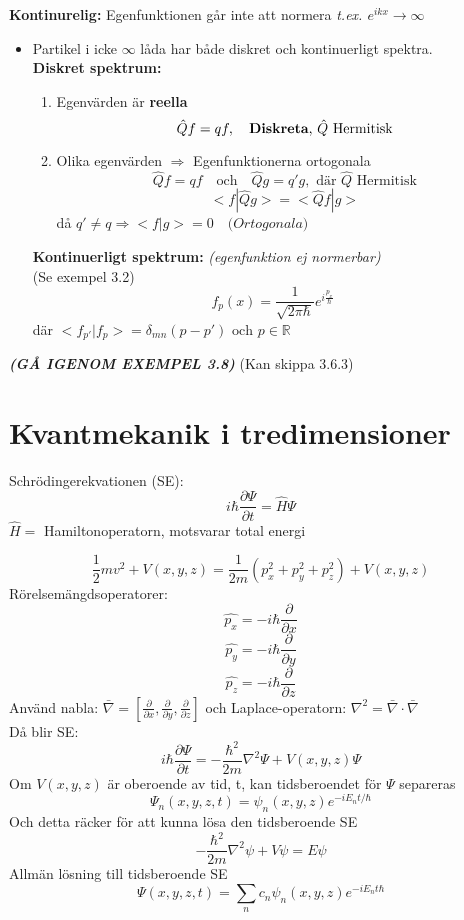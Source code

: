 \documentclass{article}
\begin{document}
    \textbf{Kontinurelig:} Egenfunktionen går inte att normera \textit{t.ex. $e^{ikx}\rightarrow\infty$}
    \begin{itemize}
      \item Partikel i icke $\infty$ låda har både diskret och kontinuerligt spektra.\\

      \textbf{Diskret spektrum:}
      \begin{enumerate}
        \item Egenvärden är \textbf{reella}
        \[
          \hat{Q}f=qf,\quad\text{\textbf{Diskreta}, $\hat{Q}$ Hermitisk}
        \]
        \item Olika egenvärden $\Rightarrow$ Egenfunktionerna ortogonala
        \[
          \hat{Q}f=qf\quad\text{och}\quad\hat{Q}g=q'g,\text{ där $\hat{Q}$ Hermitisk}
        \]
        \[
          <f|\hat{Q}g>=<\hat{Q}f|g>
        \]
        då $q'\neq q\Rightarrow<f|g>=0\quad\textit{(Ortogonala)}$
      \end{enumerate}
      \textbf{Kontinuerligt spektrum:} \textit{(egenfunktion ej normerbar)}\\
      (Se exempel 3.2)
      \[
        f_p(x)=\frac{1}{\sqrt{2\pi\hbar}}e^{i\frac{p_x}{\hbar}}
      \]
      där $<f_{p'}|f_p>=\delta_{mn}(p-p')\text{ och }p\in\mathbb{R}$

    \end{itemize}

    \textbf{\textit{(GÅ IGENOM EXEMPEL 3.8)}} (Kan skippa 3.6.3)

\section{Kvantmekanik i tredimensioner}
  Schrödingerekvationen (SE):
  \[
    i\hbar\frac{\partial \Psi}{\partial t}= \hat{H}\Psi
  \]
  $\hat{H}=$ Hamiltonoperatorn, motsvarar total energi

  \[
    \frac{1}{2}mv^2+V(x,y,z)=\frac{1}{2m}(p_x^2+p_y^2+p_z^2)+V(x,y,z)
  \]
  Rörelsemängdsoperatorer:
  \[
    \hat{p_x}=-i\hbar\frac{\partial}{\partial x}
  \]
  \[
    \hat{p_y}=-i\hbar\frac{\partial}{\partial y}
  \]
  \[
    \hat{p_z}=-i\hbar\frac{\partial}{\partial z}
  \]
  Använd nabla: $\bar{\nabla}=[\frac{\partial}{\partial x},\frac{\partial}{\partial y},\frac{\partial}{\partial z}]$ och Laplace-operatorn: $\nabla^2=\bar{\nabla}\cdot\bar{\nabla}$\\
  Då blir SE:
  \[
    i\hbar\frac{\partial\Psi}{\partial t}=-\frac{\hbar^2}{2m}\nabla^2\Psi+V(x,y,z)\Psi
  \]
  Om $V(x,y,z)$ är oberoende av tid, t, kan tidsberoendet för $\Psi$ separeras
  \[
    \Psi_n(x,y,z,t)=\psi_n(x,y,z)e^{-iE_nt/\hbar}
  \]
  Och detta räcker för att kunna lösa den tidsberoende SE
  \[
    -\frac{\hbar^2}{2m}\nabla^2\psi+V\psi =E\psi
  \]
  Allmän lösning till tidsberoende SE
  \[
    \Psi(x,y,z,t)=\sum_nc_n\psi_n(x,y,z)e^{-iE_nt\hbar}
  \]
\end{document}
